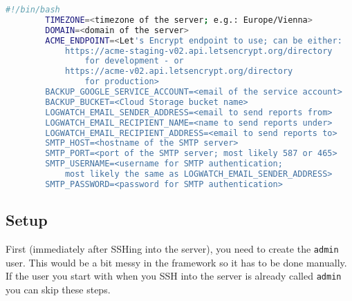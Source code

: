 \documentclass[12pt,a4paper]{report}
\begin{document}
	\pagebreak
	\begin{lstlisting}[language=bash]
		#!/bin/bash
		TIMEZONE=<timezone of the server; e.g.: Europe/Vienna>
		DOMAIN=<domain of the server>
		ACME_ENDPOINT=<Let's Encrypt endpoint to use; can be either:
		    https://acme-staging-v02.api.letsencrypt.org/directory
		        for development - or
		    https://acme-v02.api.letsencrypt.org/directory
		        for production>
		BACKUP_GOOGLE_SERVICE_ACCOUNT=<email of the service account>
		BACKUP_BUCKET=<Cloud Storage bucket name>
		LOGWATCH_EMAIL_SENDER_ADDRESS=<email to send reports from>
		LOGWATCH_EMAIL_RECIPIENT_NAME=<name to send reports under>
		LOGWATCH_EMAIL_RECIPIENT_ADDRESS=<email to send reports to>
		SMTP_HOST=<hostname of the SMTP server>
		SMTP_PORT=<port of the SMTP server; most likely 587 or 465>
		SMTP_USERNAME=<username for SMTP authentication;
		    most likely the same as LOGWATCH_EMAIL_SENDER_ADDRESS>
		SMTP_PASSWORD=<password for SMTP authentication>
	\end{lstlisting}

	\subsection{Setup}
	First (immediately after SSHing into the server), you need to create the \lstinline|admin| user. This would be a bit messy in the framework so it has to be done manually. If the user you start with when you SSH into the server is already called \lstinline|admin| you can skip these steps.
	
\end{document}
